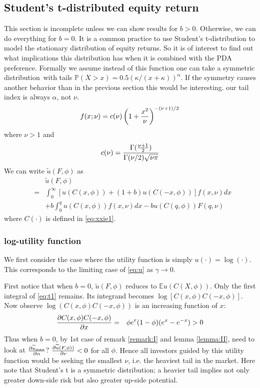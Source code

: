 \documentclass[11pt,a4]{amsart}
\newcommand{\pd}{\partial}
\newcommand{\red}{\color{darkred}}
\newcommand{\blue}{\color{darkblue}}
\newcommand{\wt}{\widetilde}
\newcommand{\ds}{distribution}
\newcommand{\E }{{\mathbb E}}
\renewcommand{\P }{{\mathbb P}}
\newcommand{\1}{{\mathbf 1}}
\begin{document}
\subsection{Student's t-distributed equity return}
{\red This section is incomplete unless we can show results for $b>0$. Otherwise, we can do everything for $b=0$.} 
It is a common practice to use Student's t-distribution to model the
stationary distribution of equity returns. So it is of interest to
find out what implications this distribution has when it is combined
with the PDA preference. Formally we assume {\red instead of this function one can take a symmetric \ds\ with tails
$\P(X>x)=0.5 (\kappa/(x+\kappa))^{\alpha}$. If the symmetry causes another behavior than in the previous section this would be interesting.}
{\blue our tail index is always $\alpha$, not $\nu$.}
\[
f(x; \nu) = c(\nu) \left(
  1 + {x^2 \over \nu}
\right)^{-(\nu + 1)/2}
\]
where $\nu > 1$ and
\[
c(\nu) = {
  \Gamma({\nu + 1 \over 2})
  \over
  \Gamma(\nu/2) \sqrt{\nu \pi}
}
\]
We can write $\wt u(F, \phi)$ as
\begin{eqnarray}
  && \wt u(F, \phi) \nonumber \\
  &=&
  \int_{0}^{\infty}
  \left[
    u(C(x, \phi)) + (1 + b)u(C(-x, \phi))
  \right]
  f(x, \nu) dx \nonumber \\
  &&
  + b \int_{0}^{q}
  u(C(x, \phi))
  f(x, \nu) dx - b u(C(q, \phi)) F(q, \nu)
  \label{eq:t1}
\end{eqnarray}
where $C(\cdot)$ is defined in \eqref{eq:xxie1}.

\subsubsection{log-utility function}
We first consider the case where the utility function is simply
$u(\cdot) = \log(\cdot)$. This corresponds to the limiting case of
\eqref{eq:u} as $\gamma \to 0$.

First notice that when $b = 0$, $\wt u(F, \phi)$ reduces to
$\E u(C(X, \phi))$. Only the first integral of \eqref{eq:t1} remains.
Its integrand becomes $\log[C(x, \phi) C(-x, \phi)]$.
Now observe $\log(C(x, \phi)C(-x, \phi))$ is an increasing function of
$x$:
\begin{eqnarray*}
  {\pd C(x, \phi) C(-x, \phi) \over \pd x}
  &=&
  \phi e^r (1 - \phi) (e^x - e^{-x}) > 0
\end{eqnarray*}
Thus when $b = 0$, by 1st case of remark \ref{remark:I} and lemma
\ref{lemma:II}, {\red need to look at $\pd \wt u_{\rm max} \over \pd \alpha$?} 
${\pd \wt u(F, \phi)) \over \pd \nu} < 0$ for all $\phi$. Hence all
investors guided by this utility function would be seeking the
smallest $\nu$, i.e. the heaviest tail in the market. Here note that
Student's t is a symmetric distribution; a heavier tail implies not
only greater down-side risk but also greater up-side potential.
\end{document}
